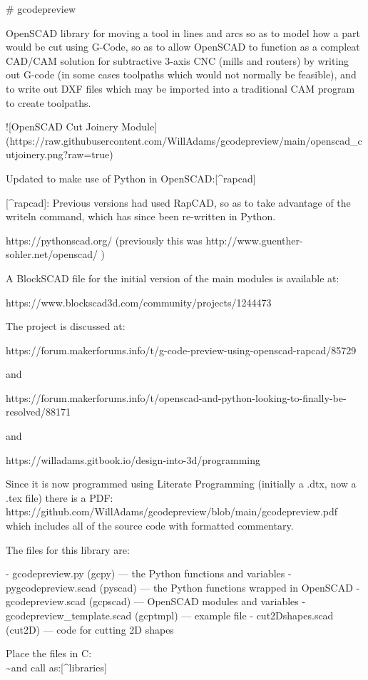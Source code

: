 \documentclass{ltxdoc}
\begin{document}
\begin{readme}
# gcodepreview

OpenSCAD library for moving a tool in lines and arcs 
so as to model how a part would be cut using G-Code, 
so as to allow OpenSCAD to function as a compleat 
CAD/CAM solution for subtractive 3-axis CNC (mills  
and routers) by writing out G-code (in some cases 
toolpaths which would not normally be feasible), 
and to write out DXF files which may be imported 
into a traditional CAM program to create toolpaths.

![OpenSCAD Cut Joinery Module](https://raw.githubusercontent.com/WillAdams/gcodepreview/main/openscad_cutjoinery.png?raw=true)

Updated to make use of Python in OpenSCAD:[^rapcad]

[^rapcad]: Previous versions had used RapCAD, so as to take advantage of the writeln command, which has since been re-written in Python.

https://pythonscad.org/ (previously this was http://www.guenther-sohler.net/openscad/ )

A BlockSCAD file for the initial version of the 
main modules is available at:

https://www.blockscad3d.com/community/projects/1244473

The project is discussed at:

https://forum.makerforums.info/t/g-code-preview-using-openscad-rapcad/85729 

and

https://forum.makerforums.info/t/openscad-and-python-looking-to-finally-be-resolved/88171

and

https://willadams.gitbook.io/design-into-3d/programming

Since it is now programmed using Literate Programming 
(initially a .dtx, now a .tex file) there is a PDF:
https://github.com/WillAdams/gcodepreview/blob/main/gcodepreview.pdf
which includes all of the source code with formatted 
commentary.

The files for this library are:

 - gcodepreview.py (gcpy) --- the Python functions and variables
 - pygcodepreview.scad (pyscad) --- the Python functions wrapped in OpenSCAD
 - gcodepreview.scad (gcpscad) --- OpenSCAD modules and variables
 - gcodepreview_template.scad (gcptmpl) --- example file
 - cut2Dshapes.scad (cut2D) --- code for cutting 2D shapes 

Place the files in C:\Users\\\~\Documents\OpenSCAD\libraries and call as:[^libraries]


\end{readme}
\end{document}
